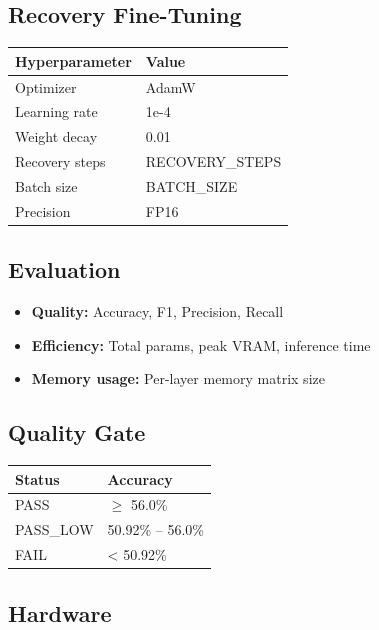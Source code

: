 \subsection{Recovery Fine-Tuning}

\begin{table}[H]
\centering
\small
\begin{tabular}{ll}
\toprule
\textbf{Hyperparameter} & \textbf{Value} \\
\midrule
Optimizer & AdamW \\
Learning rate & 1e-4 \\
Weight decay & 0.01 \\
Recovery steps & {{RECOVERY\_STEPS}} \\
Batch size & {{BATCH\_SIZE}} \\
Precision & FP16 \\
\bottomrule
\end{tabular}
\end{table}

\subsection{Evaluation}

\begin{itemize}
\item \textbf{Quality:} Accuracy, F1, Precision, Recall
\item \textbf{Efficiency:} Total params, peak VRAM, inference time
\item \textbf{Memory usage:} Per-layer memory matrix size

\end{itemize}
\subsection{Quality Gate}

\begin{table}[H]
\centering
\small
\begin{tabular}{ll}
\toprule
\textbf{Status} & \textbf{Accuracy} \\
\midrule
PASS & $\ge$ 56.0\% \\
PASS\_LOW & 50.92\% -- 56.0\% \\
FAIL & < 50.92\% \\
\bottomrule
\end{tabular}
\end{table}

\subsection{Hardware}

